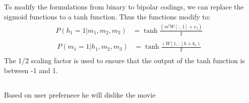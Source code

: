 \documentclass{article}
\begin{document}
\subsection{}
To modify the formulations from binary to bipolar codings, we can replace the sigmoid functions
to a tanh function. Thus the functions modify to:
\begin{align*}
    P(h_1 = 1 | m_1, m_2, m_3) &= \tanh{\frac{(m^tW[:,1] + c_1)}{2}}\\
\end{align*}
\begin{align*}
    P(m_1 = 1 | h_1, m_2, m_3) &= \tanh{\frac{(W[1,:]h + b_1)}{2}}\\
\end{align*}
The 1/2 scaling factor is used to ensure that the output of the tanh function is between -1 and 1.

\subsection{}
Based on user prefernece he will dislike the movie
\end{document}

